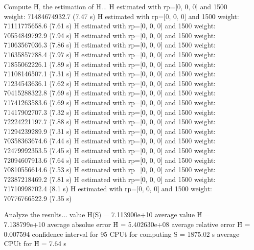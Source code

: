 Compute H̃, the estimation of H...
  H estimated with rp=[0, 0, 0] and 1500 weight:  71484674932.7  (7.47 s)
  H estimated with rp=[0, 0, 0] and 1500 weight:  71111775658.6  (7.61 s)
  H estimated with rp=[0, 0, 0] and 1500 weight:  70554849792.9  (7.94 s)
  H estimated with rp=[0, 0, 0] and 1500 weight:  71063567036.3  (7.86 s)
  H estimated with rp=[0, 0, 0] and 1500 weight:  71635857788.4  (7.97 s)
  H estimated with rp=[0, 0, 0] and 1500 weight:  71855062226.1  (7.89 s)
  H estimated with rp=[0, 0, 0] and 1500 weight:  71108146507.1  (7.31 s)
  H estimated with rp=[0, 0, 0] and 1500 weight:  71234543636.1  (7.62 s)
  H estimated with rp=[0, 0, 0] and 1500 weight:  70415288322.8  (7.69 s)
  H estimated with rp=[0, 0, 0] and 1500 weight:  71741263583.6  (7.69 s)
  H estimated with rp=[0, 0, 0] and 1500 weight:  71417902707.3  (7.32 s)
  H estimated with rp=[0, 0, 0] and 1500 weight:  72224221197.7  (7.88 s)
  H estimated with rp=[0, 0, 0] and 1500 weight:  71294239289.9  (7.31 s)
  H estimated with rp=[0, 0, 0] and 1500 weight:  70358363674.6  (7.44 s)
  H estimated with rp=[0, 0, 0] and 1500 weight:  72479992353.5  (7.45 s)
  H estimated with rp=[0, 0, 0] and 1500 weight:  72094607913.6  (7.64 s)
  H estimated with rp=[0, 0, 0] and 1500 weight:  70810556614.6  (7.53 s)
  H estimated with rp=[0, 0, 0] and 1500 weight:  72387218469.2  (7.81 s)
  H estimated with rp=[0, 0, 0] and 1500 weight:  71710998702.4  (8.1 s)
  H estimated with rp=[0, 0, 0] and 1500 weight:  70776766522.9  (7.35 s)

Analyze the results...
  value H(S)                  = 7.113900e+10 
  average value H̃             = 7.138799e+10 
  average absolue error H̃     = 5.402630e+08 
  average relative error H̃    = 0.007594 
  confidence interval for 95%
  CPUt for computing S         = 1875.02 s
  average CPUt for H̃           = 7.64 s


